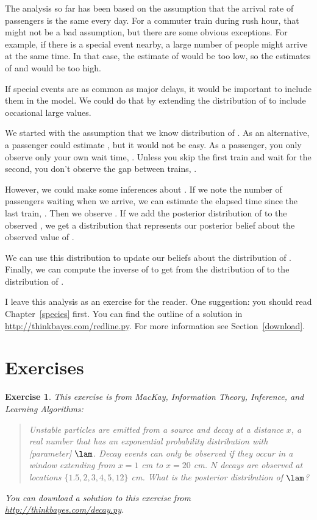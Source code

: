 \documentclass[12pt]{book}
\theoremstyle{exercise}
\newtheorem{exercise}{Exercise}[chapter]
\begin{document}
The analysis so far has been based on the assumption that the
arrival rate of passengers is the same every day.  For a commuter
train during rush hour, that might not be a bad assumption, but
there are some obvious exceptions.  For example, if there is a special
event nearby, a large number of people might arrive at the same time.
In that case, the estimate of  would be too low, so the
estimates of  and  would be too high.

If special events are as common as major delays, it would
be important to include them in the model.  We could do that by
extending the distribution of  to include occasional
large values.

We started with the assumption that we know
distribution of .
As an alternative, a passenger could estimate , but it would
not be easy.
As a passenger, you only
observe only your own wait time, .  Unless you skip
the first train and wait for the second, you don't
observe the gap between trains, .

However, we could make some inferences about .  If we note
the number of passengers waiting when we arrive, we can estimate
the elapsed time since the last train, .  Then we observe
.  If we add the posterior distribution of  to
the observed , we get a distribution that represents
our posterior belief about the observed value of .

We can use this distribution to update our beliefs about the
distribution of .  Finally, we can compute the
inverse of  to get from the distribution of 
to the distribution of .

I leave this analysis as an exercise for the
reader.  One suggestion: you should read Chapter~\ref{species} first.
You can find the outline of
a solution in \url{http://thinkbayes.com/redline.py}.
  For more information
see Section~\ref{download}.

\section{Exercises}

\begin{exercise}
This exercise is from
MacKay, {\em Information Theory, Inference, and Learning Algorithms}:

\begin{quote}
    Unstable particles are emitted from a source and decay at a
distance $x$, a real number that has an exponential probability
distribution with [parameter] $\lam$.  Decay events can only be
observed if they occur in a window extending from $x=1$ cm to $x=20$
cm.  $N$ decays are observed at locations $\{ 1.5, 2, 3, 4, 5, 12 \}$
cm.  What is the posterior distribution of $\lam$?

\end{quote}

You can download a solution to this exercise from
\url{http://thinkbayes.com/decay.py}.

\end{exercise}
\end{document}
